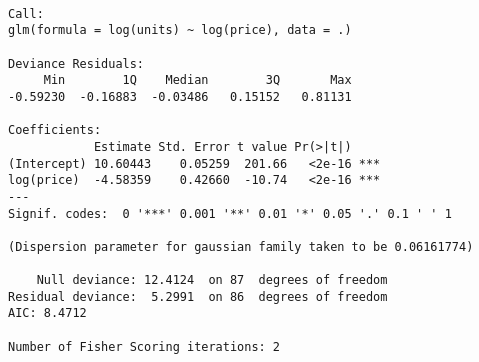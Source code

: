 \documentclass[]{article}
\newenvironment{Shaded}{\begin{snugshade}}{\end{snugshade}}
\newcommand{\CommentTok}[1]{\textcolor[rgb]{0.56,0.35,0.01}{\textit{#1}}}
\newcommand{\DataTypeTok}[1]{\textcolor[rgb]{0.13,0.29,0.53}{#1}}
\newcommand{\DecValTok}[1]{\textcolor[rgb]{0.00,0.00,0.81}{#1}}
\newcommand{\KeywordTok}[1]{\textcolor[rgb]{0.13,0.29,0.53}{\textbf{#1}}}
\newcommand{\NormalTok}[1]{#1}
\newcommand{\OperatorTok}[1]{\textcolor[rgb]{0.81,0.36,0.00}{\textbf{#1}}}
\newcommand{\OtherTok}[1]{\textcolor[rgb]{0.56,0.35,0.01}{#1}}
\newcommand{\StringTok}[1]{\textcolor[rgb]{0.31,0.60,0.02}{#1}}
\begin{document}
\begin{Shaded}
\end{Shaded}

\begin{verbatim}

Call:
glm(formula = log(units) ~ log(price), data = .)

Deviance Residuals: 
     Min        1Q    Median        3Q       Max  
-0.59230  -0.16883  -0.03486   0.15152   0.81131  

Coefficients:
            Estimate Std. Error t value Pr(>|t|)    
(Intercept) 10.60443    0.05259  201.66   <2e-16 ***
log(price)  -4.58359    0.42660  -10.74   <2e-16 ***
---
Signif. codes:  0 '***' 0.001 '**' 0.01 '*' 0.05 '.' 0.1 ' ' 1

(Dispersion parameter for gaussian family taken to be 0.06161774)

    Null deviance: 12.4124  on 87  degrees of freedom
Residual deviance:  5.2991  on 86  degrees of freedom
AIC: 8.4712

Number of Fisher Scoring iterations: 2
\end{verbatim}

\begin{Shaded}
\end{Shaded}
\end{document}
